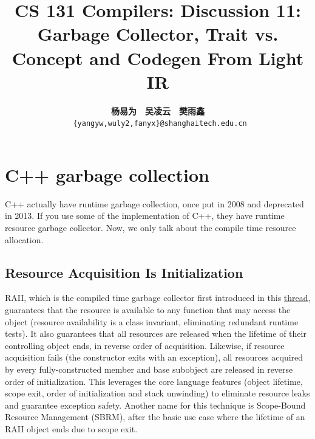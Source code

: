 \documentclass[a4paper]{exam}
\title{CS 131 Compilers: Discussion 11: Garbage Collector, Trait vs. Concept and Codegen From Light IR}
\author{\textbf{杨易为}~~\textbf{吴凌云}~~\textbf{樊雨鑫} \\ \texttt{ \{yangyw,wuly2,fanyx\}@shanghaitech.edu.cn}}
\theoremstyle{definition}
\begin{document}
\maketitle
\section{C++ garbage collection}
C++ actually have runtime garbage collection, once put in 2008 and deprecated in 2013. If you use some of the implementation of C++, they have runtime resource garbage collector. Now, we only talk about the compile time resource allocation.
\subsection{Resource Acquisition Is Initialization}
RAII, which is the compiled time garbage collector first introduced in this \href{http://www.open-std.org/jtc1/sc22/wg21/docs/papers/2008/n2670.htm}{thread}, guarantees that the resource is available to any function that may access the object (resource availability is a class invariant, eliminating redundant runtime tests). It also guarantees that all resources are released when the lifetime of their controlling object ends, in reverse order of acquisition. Likewise, if resource acquisition fails (the constructor exits with an exception), all resources acquired by every fully-constructed member and base subobject are released in reverse order of initialization. This leverages the core language features (object lifetime, scope exit, order of initialization and stack unwinding) to eliminate resource leaks and guarantee exception safety. Another name for this technique is Scope-Bound Resource Management (SBRM), after the basic use case where the lifetime of an RAII object ends due to scope exit.
\end{document}
